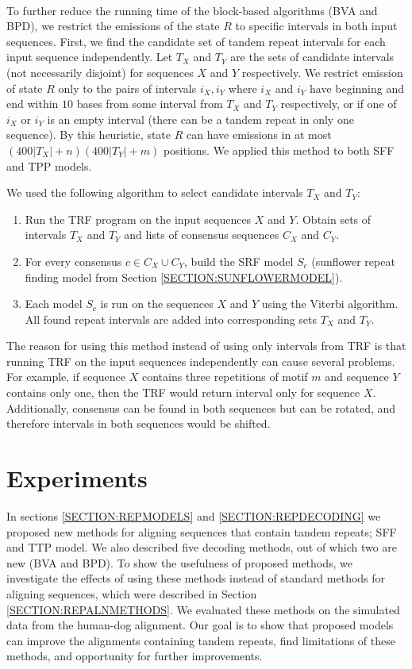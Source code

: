 \paragraph{}
To further reduce the running time of the block-based algorithms (BVA and BPD),
we restrict the emissions of the state $R$ to specific intervals in both input
sequences. First, we find the candidate set of tandem repeat intervals for
each input sequence independently. Let $T_X$ and $T_Y$ are the
sets of candidate intervals (not necessarily disjoint) for sequences $X$ and
$Y$ respectively. We restrict emission of state $R$ only to the pairs of
intervals $i_X, i_Y$ where $i_X$ and $i_Y$ have beginning and end within $10$
bases from some interval from $T_X$ and $T_Y$ respectively, or if one of $i_X$
or $i_Y$ is an empty interval (there can be a tandem repeat in only one
sequence).  By this heuristic, state $R$ can have emissions in at most
$(400|T_X|+n)(400|T_Y|+m)$ positions. We applied this method to both SFF and
TPP models.

We used the following algorithm to select candidate intervals $T_X$ and $T_Y$:
\begin{enumerate}[itemsep=-1mm]
\item Run the TRF program on the input sequences $X$ and $Y$. Obtain sets of
intervals $T_X$ and $T_Y$ and lists of consensus sequences $C_X$ and $C_Y$.

\item For every consensus $c\in C_X\cup C_Y$, build the SRF model $S_c$
(sunflower repeat finding model from Section \ref{SECTION:SUNFLOWERMODEL}). 

\item Each model $S_c$ is run on the sequences $X$ and $Y$ using the Viterbi
algorithm. All found repeat intervals are added into corresponding sets $T_X$
and $T_Y$.

\end{enumerate}
The reason for using this method instead of using only intervals from TRF is
that running TRF on the input sequences independently can cause several
problems. For example, if sequence $X$ contains three repetitions of motif $m$
and sequence $Y$ contains only one, then the TRF would return interval only for
sequence $X$. Additionally, consensus can be found in both sequences but can be
rotated, and therefore intervals in both sequences would be shifted.


\section{Experiments}
In sections \ref{SECTION:REPMODELS} and \ref{SECTION:REPDECODING} we proposed
new methods for aligning sequences that contain tandem repeats; SFF and TTP
model.  We also described five decoding methods, out of which two are new (BVA
and BPD). To show the usefulness of proposed methods, we investigate the
effects of using these methods instead of standard methods for aligning
sequences, which were described in Section \ref{SECTION:REPALNMETHODS}. We 
evaluated these methods on the simulated data from the human-dog alignment. Our
goal is to show that proposed models can improve the alignments containing
tandem repeats, find limitations of these methods, and opportunity for further
improvements.

